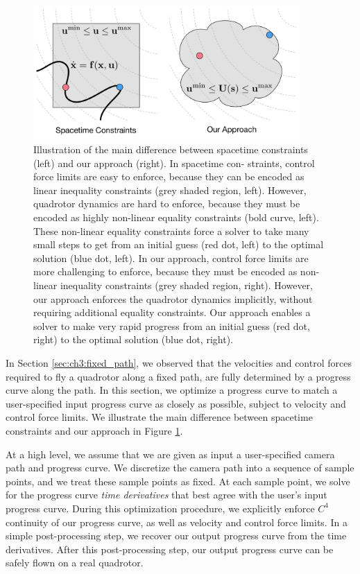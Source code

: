 \begin{figure}[t]
\centering
\includegraphics[width=4.0in]{images/2016_siggraph/22_optimization_problem_diagram.pdf}
\caption{
Illustration of the main difference between spacetime constraints (left) and our approach (right).
In spacetime con- straints, control force limits are easy to enforce, because they can be encoded as linear inequality constraints (grey shaded region, left).
However, quadrotor dynamics are hard to enforce, because they must be encoded as highly non-linear equality constraints (bold curve, left).
These non-linear equality constraints force a solver to take many small steps to get from an initial guess (red dot, left) to the optimal solution (blue dot, left).
In our approach, control force limits are more challenging to enforce, because they must be encoded as non-linear inequality constraints (grey shaded region, right).
However, our approach enforces the quadrotor dynamics implicitly, without requiring additional equality constraints.
Our approach enables a solver to make very rapid progress from an initial guess (red dot, right) to the optimal solution (blue dot, right).
}
\label{fig:ch3:optimization_problem_diagram}
\end{figure}

In Section \ref{sec:ch3:fixed_path}, we observed that the velocities and control forces required to fly a quadrotor along a fixed path, are fully determined by a progress curve along the path.
In this section, we optimize a progress curve to match a user-specified input progress curve as closely as possible, subject to velocity and control force limits.
We illustrate the main difference between spacetime constraints and our approach in Figure \ref{fig:ch3:optimization_problem_diagram}.

At a high level, we assume that we are given as input a user-specified camera path and progress curve. We discretize the camera path into a sequence of sample points, and we treat these sample points as fixed.
At each sample point, we solve for the progress curve \emph{time derivatives} that best agree with the user's input progress curve.
During this optimization procedure, we explicitly enforce $C^4$ continuity of our progress curve, as well as velocity and control force limits.
In a simple post-processing step, we recover our output progress curve from the time derivatives.
After this post-processing step,  our output progress curve can be safely flown on a real quadrotor.

